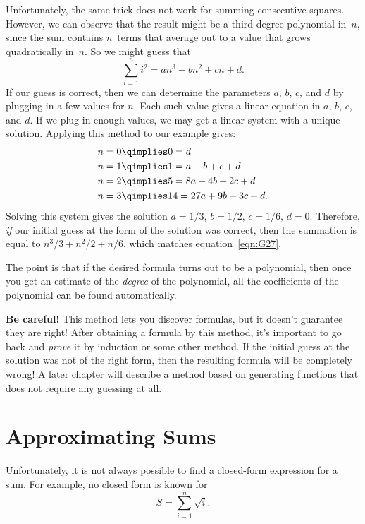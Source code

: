 Unfortunately, the same trick does not work for summing consecutive
squares.  However, we can observe that the result might be a
third-degree polynomial in~$n$, since the sum contains $n$~terms that
average out to a value that grows quadratically in~$n$.  So we might
guess that
\[
    \sum_{i=1}^n i^2 = an^3 + bn^2 + cn + d.
\]
If our guess is correct, then we can determine the parameters $a$,
$b$, $c$, and $d$ by plugging in a few values for $n$.  Each such
value gives a linear equation in $a$, $b$, $c$, and $d$.  If we plug
in enough values, we may get a linear system with a unique solution.
Applying this method to our example gives:
\begin{align*}
n = 0 & \qimplies  0 = d \\
n = 1 & \qimplies  1 = a + b + c + d \\
n = 2 & \qimplies  5 = 8a + 4b + 2c + d \\
n = 3 & \qimplies  14 = 27a + 9b + 3c + d.
\end{align*}
Solving this system gives the solution $a = 1/3$, $b = 1/2$, $c =
1/6$, $d = 0$.  Therefore, \emph{if} our initial guess at the form of
the solution was correct, then the summation is equal to $n^3/3 +
n^2/2 + n/6$, which matches equation~\ref{eqn:G27}.

The point is that if the desired formula turns out to be a polynomial,
then once you get an estimate of the \emph{degree} of the polynomial,
all the coefficients of the polynomial can be found automatically.

\textbf{Be careful!}  This method lets you discover formulas, but it
doesn't guarantee they are right!  After obtaining a formula by this
method, it's important to go back and \emph{prove} it by induction
or some other method.  If the initial guess at the solution was
not of the right form, then the resulting formula will be completely
wrong!  A later chapter will describe
a method based on generating functions that does not require any
guessing at all.

\begin{problems}
\classproblems
{}

\end{problems}

\section{Approximating Sums}\label{sec:integral_method}

Unfortunately, it is not always possible to find a closed-form
expression for a sum.  For example, no closed form is known for
\[
    S = \sum_{i = 1}^n \sqrt{i}.
\]

